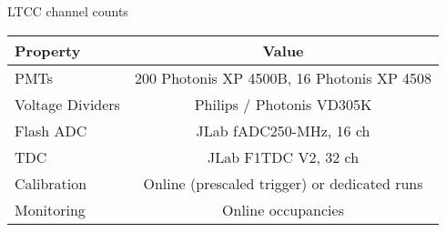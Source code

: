 \begin{center}
	LTCC channel counts \\
	\begin{tabular}{| l | c |}
		\hline \hline
		Property                 & Value \\
		\hline
		PMTs             &  200 Photonis XP 4500B, 16 Photonis XP 4508    \\
		Voltage Dividers & Philips / Photonis VD305K                      \\
		Flash ADC        & JLab fADC250-MHz, 16 ch                        \\
		TDC              & JLab F1TDC V2, 32 ch                           \\
		Calibration      & Online (prescaled trigger) or dedicated runs   \\
		Monitoring       & Online occupancies                             \\
		\hline \hline
	\end{tabular}
\end{center}


